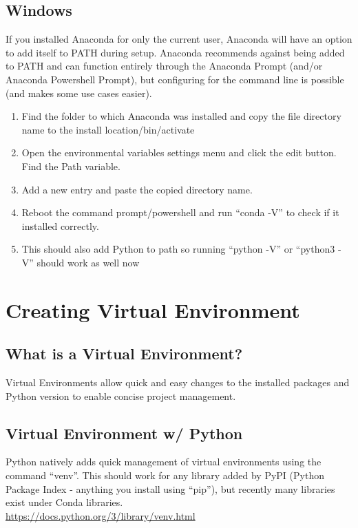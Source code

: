 \documentclass[12pt]{article}
\begin{document}
        \subsection{Windows}
            If you installed Anaconda for only the current user, Anaconda will have an option to add itself to PATH during setup.
            Anaconda recommends against being added to PATH and can function entirely through the Anaconda Prompt (and/or Anaconda Powershell Prompt),
            but configuring for the command line is possible (and makes some use cases easier). 
            \begin{enumerate}
                \item Find the folder to which Anaconda was installed and copy the file directory name to the \textlangle install location\textrangle /bin/activate
                \item Open the environmental variables settings menu and click the edit button. Find the Path variable.
                \item Add a new entry and paste the copied directory name.
                \item Reboot the command prompt/powershell and run “conda -V” to check if it installed correctly.
                \item This should also add Python to path so running “python -V” or “python3 -V” should work as well now
            \end{enumerate}
    \section{Creating Virtual Environment}
        \subsection{What is a Virtual Environment?}
            Virtual Environments allow quick and easy changes to the installed packages and Python version to enable concise project management.
        \subsection{Virtual Environment w/ Python}
            Python natively adds quick management of virtual environments using the command ``venv''.
            This should work for any library added by PyPI (Python Package Index - anything you install using ``pip''), but recently many libraries exist under Conda libraries.
            \\\url{https://docs.python.org/3/library/venv.html}
\end{document}
